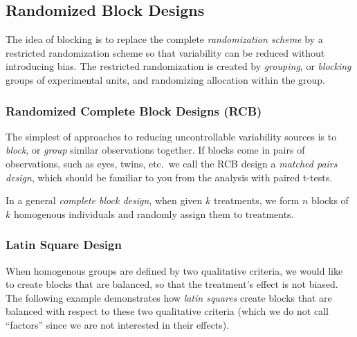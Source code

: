 \subsection{Randomized Block Designs}
The idea of blocking is to replace the complete \emph{randomization scheme} by a restricted randomization scheme so that variability can be reduced without introducing bias. 
The restricted randomization is created by \emph{grouping}, or \emph{blocking} groups of experimental units, and randomizing allocation within the group. 




\subsubsection{Randomized Complete Block Designs (RCB)}
The simplest of approaches to reducing uncontrollable variability sources is to \emph{block}, or \emph{group} similar observations together. 
If blocks come in pairs of observations, such as eyes, twins, etc.\, we call the RCB design a \emph{matched pairs design}, which should be familiar to you from the analysis with paired t-tests.

In a general \emph{complete block design}, when given $k$ treatments, we form $n$ blocks of $k$ homogenous individuals and randomly assign them to treatments. 




\subsubsection{Latin Square Design}
When homogenous groups are defined by two qualitative criteria, we would like to create blocks that are balanced, so that the treatment's effect is not biased.
The following example demonstrates how \emph{latin squares} create blocks that are balanced with respect to these two qualitative criteria (which we do not call ``factors'' since we are not interested in their effects). 



